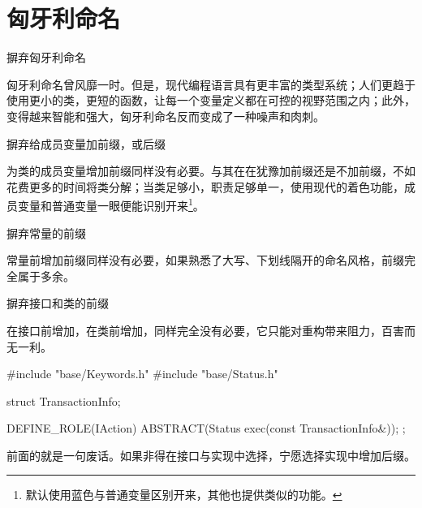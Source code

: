 \section{匈牙利命名}
\begin{content}

\begin{advise}
摒弃匈牙利命名
\end{advise}

匈牙利命名曾风靡一时。但是，现代编程语言具有更丰富的类型系统；人们更趋于使用更小的类，更短的函数，让每一个变量定义都在可控的视野范围之内；此外，变得越来智能和强大，匈牙利命名反而变成了一种噪声和肉刺。

\begin{advise}
摒弃给成员变量加前缀，或后缀
\end{advise}

为类的成员变量增加前缀同样没有必要。与其在在犹豫加前缀还是不加前缀，不如花费更多的时间将类分解；当类足够小，职责足够单一，使用现代的着色功能，成员变量和普通变量一眼便能识别开来\footnote{默认使用蓝色与普通变量区别开来，其他也提供类似的功能。}。

\begin{advise}
摒弃常量的前缀
\end{advise}

常量前增加前缀同样没有必要，如果熟悉了大写、下划线隔开的命名风格，前缀完全属于多余。

\begin{advise}
摒弃接口和类的前缀
\end{advise}

在接口前增加，在类前增加，同样完全没有必要，它只能对重构带来阻力，百害而无一利。

\begin{leftbar}
\begin{c++}
#include "base/Keywords.h"
#include "base/Status.h"

struct TransactionInfo;

DEFINE_ROLE(IAction)
{
    ABSTRACT(Status exec(const TransactionInfo&));
};
\end{c++}
\end{leftbar}

前面的就是一句废话。如果非得在接口与实现中选择，宁愿选择实现中增加后缀。

\end{content}

